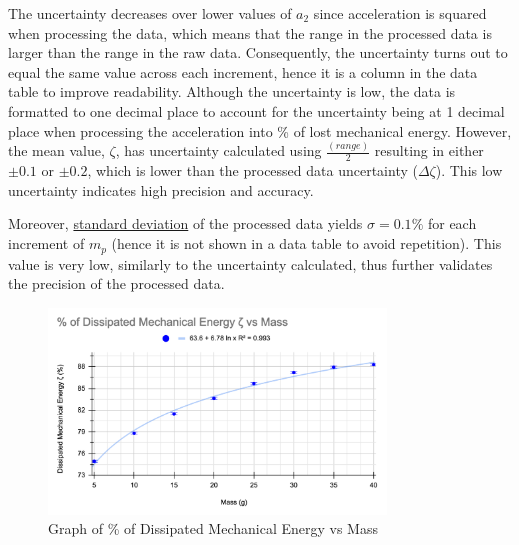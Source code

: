 \documentclass[11pt]{article}
\begin{document}
The uncertainty decreases over lower values of $a_2$ since acceleration is squared when processing the data, which means that the range in the processed data is larger than the range in the raw data. Consequently, the uncertainty turns out to equal the same value across each increment, hence it is a column in the data table to improve readability. Although the uncertainty is low, the data is formatted to one decimal place to account for the uncertainty being at 1 decimal place when processing the acceleration into \% of lost mechanical energy. However, the mean value, $\zeta$, has uncertainty calculated using $\frac{(range)}{2}$ resulting in either $\pm0.1$ or $\pm0.2$, which is lower than the processed data uncertainty ($\Delta \zeta$). This low uncertainty indicates high precision and accuracy. 

Moreover, \underline{standard deviation} of the processed data yields $\sigma =0.1\%$ for each increment of $m_p$ (hence it is not shown in a data table to avoid repetition). This value is very low, similarly to the uncertainty calculated, thus further validates the precision of the processed data. 

\newpage

\begin{figure}[h]
    \centering
    \includegraphics[width=0.8\textwidth]{img/graph1.png}
    \caption{Graph of \% of Dissipated Mechanical Energy vs Mass}
    \label{fig:6}
\end{figure}
\end{document}
